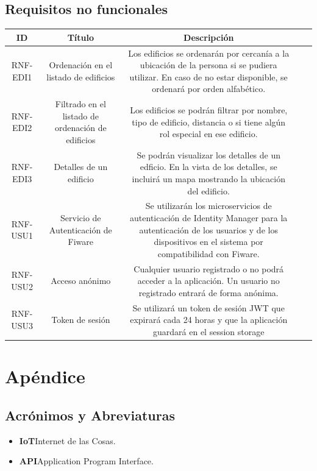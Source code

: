 \documentclass[12pt, a4paper, twoside]{article}
\newcommand\ttab{\tab \hspace{-5cm}}
\begin{document}
 \subsection{Requisitos no funcionales}
 \begin{center}
  \begin{tabular}{ |c|c|c|c|c| } 
  \hline
  ID       & Título & Descripción \\ \hline
  RNF-EDI1 & Ordenación en el listado de edificios & Los edificios se ordenarán por cercanía a la ubicación de la persona si se pudiera utilizar.
  En caso de no estar disponible, se ordenará por orden alfabético. \\ \hline

  RNF-EDI2 & Filtrado en el listado de ordenación de edificios & Los edificios se podrán filtrar por nombre, tipo de edificio, distancia o
  si tiene algún rol especial en ese edificio. \\ \hline

  RNF-EDI3 & Detalles de un edificio & Se podrán visualizar los detalles de un edficio. En la vista de los detalles, se incluirá
  un mapa mostrando la ubicación del edificio. \\ \hline

  RNF-USU1 & Servicio de Autenticación de Fiware & Se utilizarán los microservicios de autenticación de Identity Manager 
  para la autenticación de los usuarios y de los dispositivos en el sistema por compatibilidad con Fiware. \\ \hline
  
  RNF-USU2 & Acceso anónimo & Cualquier usuario registrado o no podrá acceder a la aplicación. Un usuario no registrado entrará de forma anónima. \\ \hline
  
  RNF-USU3 & Token de sesión  & Se utilizará un token de sesión JWT 
   que expirará cada 24 horas
   y que la aplicación guardará en el session storage  \\ \hline

  \end{tabular}
\end{center}
\section{Apéndice}
\subsection{Acrónimos y Abreviaturas}
\begin{itemize}
    \item \textbf{IoT}\ttab Internet de las Cosas.
    \item \textbf{API}\ttab Application Program Interface.
  \end{itemize}
\end{document}
